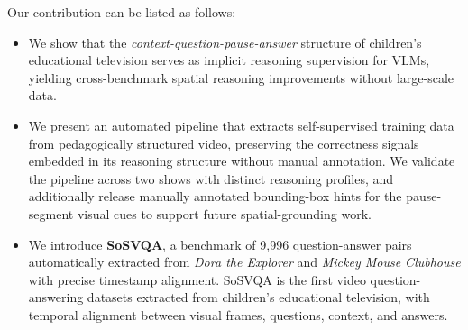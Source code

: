 \documentclass{article}
\newcommand{\com}[1]{\textcolor{red}{#1}}
\begin{document}
Our contribution can be listed as follows:
\begin{itemize}
    \item We show that the \textit{context-question-pause-answer} structure
    of children's educational television serves as implicit reasoning
    supervision for VLMs, yielding cross-benchmark spatial reasoning
    improvements without large-scale data.
    
    \item We present an automated pipeline that extracts self-supervised
    training data from pedagogically structured video, preserving the
    correctness signals embedded in its reasoning structure without manual
    annotation. We validate the pipeline across two shows with distinct
    reasoning profiles, and additionally release manually annotated
    bounding-box hints for the pause-segment visual cues to support future
    spatial-grounding work.

    \item We introduce \textbf{SoSVQA}, a benchmark of 9{,}996 question-answer
    pairs automatically extracted from \textit{Dora the Explorer} and \textit{Mickey Mouse Clubhouse} with
    precise timestamp alignment. SoSVQA is the first video question-answering datasets extracted
    from children's educational television, with temporal alignment between
    visual frames, questions, context, and answers.
\end{itemize}



\end{document}
